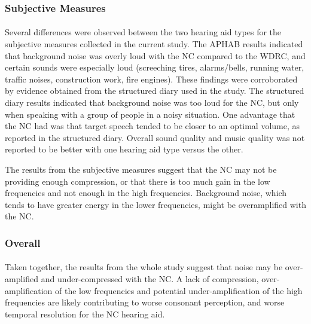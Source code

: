 \subsubsection{Subjective Measures}
\paragraph{}Several differences were observed between the two hearing aid types for the subjective measures collected in the current study.  The APHAB results indicated that background noise was overly loud with the NC compared to the WDRC, and certain sounds were especially loud (screeching tires, alarms/bells, running water, traffic noises, construction work, fire engines).  These findings were corroborated by evidence obtained from the structured diary used in the study.  The structured diary results indicated that background noise was too loud for the NC, but only when speaking with a group of people in a noisy situation.  One advantage that the NC had was that target speech tended to be closer to an optimal volume, as reported in the structured diary.  Overall sound quality and music quality was not reported to be better with one hearing aid type versus the other.

The results from the subjective measures suggest that the NC may not be providing enough compression, or that there is too much gain in the low frequencies and not enough in the high frequencies.  Background noise, which tends to have greater energy in the lower frequencies, might be overamplified with the NC.

\subsubsection{Overall}
\paragraph{}Taken together, the results from the whole study suggest that noise may be over-amplified and under-compressed with the NC.  A lack of compression, over-amplification of the low frequencies and potential under-amplification of the high frequencies are likely contributing to worse consonant perception, and worse temporal resolution for the NC hearing aid.   
